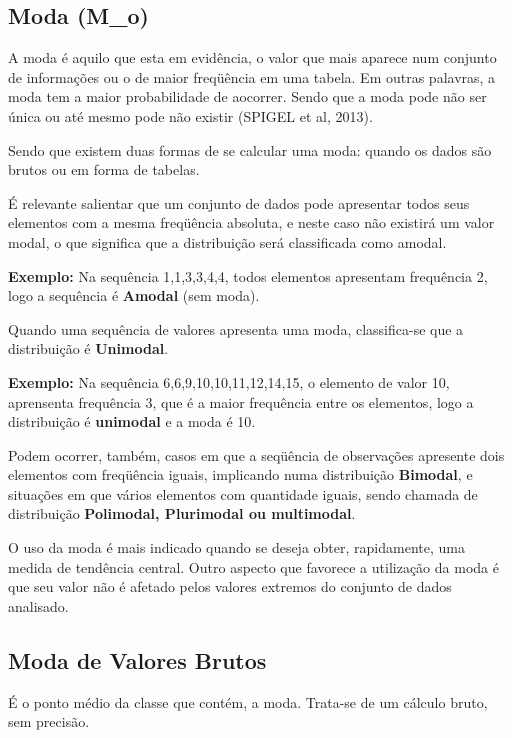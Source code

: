 \subsection{Moda (M_{o})}

A moda é aquilo que esta em evidência, o valor que mais aparece num conjunto de informações ou o de maior freqüência em uma tabela. Em outras palavras, a moda tem a maior probabilidade de aocorrer. Sendo que a moda pode não ser única ou até mesmo pode não existir (SPIGEL et al, 2013).\vskip0.3cm


Sendo que existem duas formas de se calcular uma moda: quando os dados são brutos ou em forma de tabelas.\vskip0.3cm

É relevante salientar que um conjunto de dados pode apresentar todos seus elementos com a mesma freqüência absoluta, e neste caso não existirá um valor modal, o que significa que a distribuição será classificada como amodal.\vskip0.3cm

\textbf{Exemplo:} Na sequência 1,1,3,3,4,4, todos elementos apresentam frequência 2, logo a sequência é \textbf{Amodal} (sem moda).\vskip0.3cm

Quando uma sequência de valores apresenta uma moda, classifica-se que a distribuição é \textbf{Unimodal}.\vskip0.3cm


\textbf{Exemplo:} Na sequência 6,6,9,10,10,11,12,14,15, o elemento de valor 10, aprensenta frequência 3, que é a maior frequência entre os elementos, logo a distribuição é \textbf{unimodal} e a moda é 10.\vskip0.3cm

Podem ocorrer, também, casos em que a seqüência de observações apresente dois elementos com freqüência iguais, implicando numa distribuição \textbf{Bimodal}, e situações em que vários elementos com quantidade iguais, sendo chamada de distribuição \textbf{Polimodal, Plurimodal ou multimodal}.\vskip0.3cm

O uso da moda é mais indicado quando se deseja obter, rapidamente, uma medida de tendência central. Outro aspecto que favorece a utilização da moda é que seu valor não é afetado pelos valores extremos do conjunto de dados analisado.\vskip0.3cm

\subsection{Moda de Valores Brutos}

\vskip0.3cm


É o ponto médio da classe que contém, a moda. Trata-se de um cálculo bruto, sem precisão.

